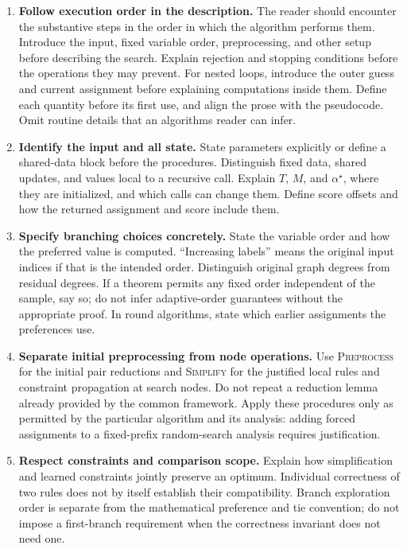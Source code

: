 \documentclass[11pt,a4paper]{article}
\begin{document}
\begin{enumerate}
\item \textbf{Follow execution order in the description.}
The reader should encounter the substantive steps in the order in which
the algorithm performs them. Introduce the input, fixed variable order,
preprocessing, and other setup before describing the search. Explain
rejection and stopping conditions before the operations they may prevent.
For nested loops, introduce the outer guess and current assignment before
explaining computations inside them. Define each quantity before its
first use, and align the prose with the pseudocode. Omit routine details
that an algorithms reader can infer.

\item \textbf{Identify the input and all state.}
State parameters explicitly or define a shared-data block before the
procedures. Distinguish fixed data, shared updates, and values local to a
recursive call. Explain $T$, $M$, and $\alpha^\star$, where they are
initialized, and which calls can change them. Define score offsets and
how the returned assignment and score include them.

\item \textbf{Specify branching choices concretely.}
State the variable order and how the preferred value is computed.
``Increasing labels'' means the original input indices if that is the
intended order. Distinguish original graph degrees from residual degrees.
If a theorem permits any fixed order independent of the sample, say so;
do not infer adaptive-order guarantees without the appropriate proof.
In round algorithms, state which earlier assignments the preferences use.

\item \textbf{Separate initial preprocessing from node operations.}
Use \textsc{Preprocess} for the initial pair reductions and
\textsc{Simplify} for the justified local rules and constraint propagation
at search nodes. Do not repeat a reduction lemma already provided by
the common framework. Apply these procedures only as permitted by the
particular algorithm and its analysis: adding forced assignments to a
fixed-prefix random-search analysis requires justification.

\item \textbf{Respect constraints and comparison scope.}
Explain how simplification and learned constraints jointly preserve an
optimum. Individual correctness of two rules does not by itself establish
their compatibility. Branch exploration order is separate from the
mathematical preference and tie convention; do not impose a first-branch
requirement when the correctness invariant does not need one.


\end{enumerate}
\end{document}
